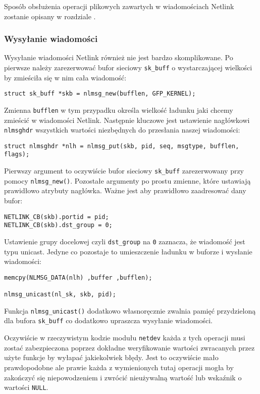 \documentclass[10pt]{scrartcl}
\begin{document}
Sposób obsłużenia operacji plikowych zawartych w wiadomościach Netlink zostanie opisany w rozdziale .

\subsubsection{Wysyłanie wiadomości}
\label{msgsend}

Wysyłanie wiadomości Netlink również nie jest bardzo skomplikowane. Po pierwsze należy zarezerwować bufor sieciowy \texttt{sk\_buff} o wystarczającej wielkości by zmieściła się w nim cała wiadomość:

\begin{verbatim}
struct sk_buff *skb = nlmsg_new(bufflen, GFP_KERNEL);
\end{verbatim}

Zmienna \texttt{bufflen} w tym przypadku określa wielkość ładunku jaki chcemy zmieścić w wiadomości Netlink. Następnie kluczowe jest ustawienie nagłówkowi \texttt{nlmsghdr} wszystkich wartości niezbędnych do przesłania naszej wiadomości:

\begin{verbatim}
struct nlmsghdr *nlh = nlmsg_put(skb, pid, seq, msgtype, bufflen, flags);
\end{verbatim}

Pierwszy argument to oczywiście bufor sieciowy \texttt{sk\_buff} zarezerwowany przy pomocy \texttt{nlmsg\_new()}. Pozostałe argumenty po prostu zmienne, które ustawiają prawidłowo atrybuty nagłówka. Ważne jest aby prawidłowo zaadresować dany bufor:

\begin{verbatim}
NETLINK_CB(skb).portid = pid;
NETLINK_CB(skb).dst_group = 0;
\end{verbatim}

Ustawienie grupy docelowej czyli \texttt{dst\_group} na \texttt{0} zaznacza, że wiadomość jest typu unicast. Jedyne co pozostaje to umieszczenie ładunku w buforze i wysłanie wiadomości:

\begin{verbatim}
memcpy(NLMSG_DATA(nlh) ,buffer ,bufflen);

nlmsg_unicast(nl_sk, skb, pid);
\end{verbatim}

Funkcja \texttt{nlmsg\_unicast()} dodatkowo własnoręcznie zwalnia pamięć przydzieloną dla bufora \texttt{sk\_buff} co dodatkowo upraszcza wysyłanie wiadomości.

Oczywiście w rzeczywistym kodzie modułu \texttt{netdev} każda z tych operacji musi zostać zabezpieczona poprzez dokładne weryfikowanie wartości zwracanych przez użyte funkcje by wyłapać jakiekolwiek błędy.  Jest to oczywiście mało prawdopodobne ale prawie każda z wymienionych tutaj operacji mogła by zakończyć się niepowodzeniem i zwrócić nieużywalną wartość lub wskaźnik o wartości \texttt{NULL}.
\end{document}
